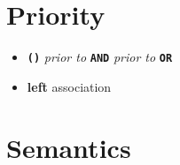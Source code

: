 \documentclass{article}
\renewcommand{\t}[1]{\texttt{\textbf{#1}}}
\begin{document}
\section{Priority}

\begin{itemize}
    \item \t{()} \textit{prior to} \t{AND} \textit{prior to} \t{OR}
    \item \textbf{left} association
\end{itemize}

\section{Semantics}
\end{document}
